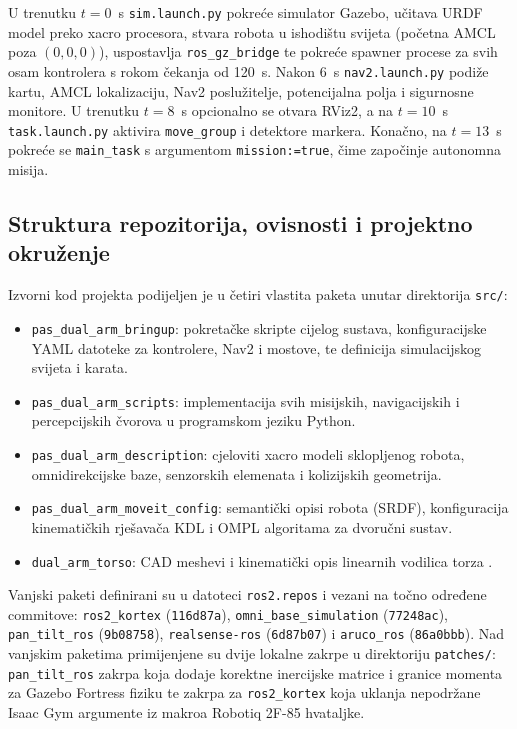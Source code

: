U trenutku $t = 0$~s \texttt{sim.launch.py} pokreće simulator Gazebo, učitava URDF model preko
xacro procesora, stvara robota u ishodištu svijeta (početna AMCL poza $(0, 0, 0)$), uspostavlja
\texttt{ros\_gz\_bridge} te pokreće spawner procese za svih osam kontrolera s rokom čekanja od 120~s.
Nakon 6~s \texttt{nav2.launch.py} podiže kartu, AMCL lokalizaciju, Nav2 poslužitelje, potencijalna
polja i sigurnosne monitore. U trenutku $t = 8$~s opcionalno se otvara RViz2, a na $t = 10$~s
\texttt{task.launch.py} aktivira \texttt{move\_group} i detektore markera. Konačno, na $t = 13$~s
pokreće se \texttt{main\_task} s argumentom \texttt{mission:=true}, čime započinje autonomna misija.

\subsection{Struktura repozitorija, ovisnosti i projektno okruženje}
\label{sec:02-repozitorij}

Izvorni kod projekta podijeljen je u četiri vlastita paketa unutar direktorija \texttt{src/}:
\begin{itemize}
  \item \texttt{pas\_dual\_arm\_bringup}: pokretačke skripte cijelog sustava, konfiguracijske YAML datoteke za kontrolere, Nav2 i mostove, te definicija simulacijskog svijeta i karata.
  \item \texttt{pas\_dual\_arm\_scripts}: implementacija svih misijskih, navigacijskih i percepcijskih čvorova u programskom jeziku Python.
  \item \texttt{pas\_dual\_arm\_description}: cjeloviti xacro modeli sklopljenog robota, omnidirekcijske baze, senzorskih elemenata i kolizijskih geometrija.
  \item \texttt{pas\_dual\_arm\_moveit\_config}: semantički opisi robota (SRDF), konfiguracija kinematičkih rješavača KDL i OMPL algoritama za dvoručni sustav.
  \item \texttt{dual\_arm\_torso}: CAD meshevi i kinematički opis linearnih vodilica torza \cite{mail2026}.
\end{itemize}

Vanjski paketi definirani su u datoteci \texttt{ros2.repos} i vezani na točno određene commitove:
\texttt{ros2\_kortex} (\texttt{116d87a}), \texttt{omni\_base\_simulation} (\texttt{77248ac}),
\texttt{pan\_tilt\_ros} (\texttt{9b08758}), \texttt{realsense-ros} (\texttt{6d87b07}) i
\texttt{aruco\_ros} (\texttt{86a0bbb}). Nad vanjskim paketima primijenjene su dvije lokalne
zakrpe u direktoriju \texttt{patches/}: \texttt{pan\_tilt\_ros} zakrpa koja dodaje korektne inercijske
matrice i granice momenta za Gazebo Fortress fiziku te zakrpa za \texttt{ros2\_kortex} koja uklanja
nepodržane Isaac Gym argumente iz makroa Robotiq 2F-85 hvataljke.

